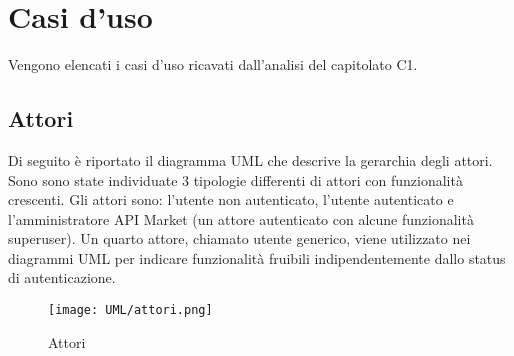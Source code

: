 \newpage
\section{Casi d'uso}
Vengono elencati i casi d'uso ricavati dall'analisi del capitolato C1.

\subsection{Attori}
Di seguito è riportato il diagramma UML che descrive la gerarchia degli attori. Sono sono state individuate 3 tipologie differenti di attori con funzionalità crescenti. Gli attori sono: l'utente non autenticato, l'utente autenticato e l'amministratore API Market (un attore autenticato con alcune funzionalità superuser). Un quarto attore, chiamato utente generico, viene utilizzato nei diagrammi UML per indicare funzionalità fruibili indipendentemente dallo status di autenticazione.

\label{Attori}

\begin{figure}[ht]
	\centering
	\texttt{[image: UML/attori.png]}
	\caption{Attori}
\end{figure}





































